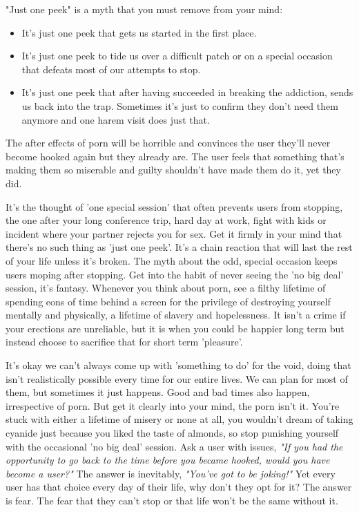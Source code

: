 \documentclass[easypeasy.tex]{subfiles}
\begin{document}
"Just one peek" is a myth that you must remove from your mind:
\begin{itemize}
  \item It's just one peek that gets us started in the first place.
  \item It's just one peek to tide us over a difficult patch or on a special occasion that defeats most of our attempts to stop.
  \item It's just one peek that after having succeeded in breaking the addiction, sends us back into the trap. Sometimes it's just to confirm they don't need them anymore and one harem visit does just that.
\end{itemize}
The after effects of porn will be horrible and convinces the user they'll never become hooked again but they already are. The user feels that something that's making them so miserable and guilty shouldn't have made them do it, yet they did.

It's the thought of 'one special session' that often prevents users from stopping, the one after your long conference trip, hard day at work, fight with kids or incident where your partner rejects you for sex. Get it firmly in your mind that there's no such thing as 'just one peek'. It's a chain reaction that will last the rest of your life unless it's broken. The myth about the odd, special occasion keeps users moping after stopping. Get into the habit of never seeing the 'no big deal' session, it's fantasy. Whenever you think about porn, see a filthy lifetime of spending eons of time behind a screen for the privilege of destroying yourself mentally and physically, a lifetime of slavery and hopelessness. It isn't a crime if your erections are unreliable, but it is when you could be happier long term but instead choose to sacrifice that for short term 'pleasure'.

It's okay we can't always come up with 'something to do' for the void, doing that isn't realistically possible every time for our entire lives. We can plan for most of them, but sometimes it just happens. Good and bad times also happen, irrespective of porn. But get it clearly into your mind, the porn isn't it. You're stuck with either a lifetime of misery or none at all, you wouldn't dream of taking cyanide just because you liked the taste of almonds, so stop punishing yourself with the occasional 'no big deal' session. Ask a user with issues, \textit{"If you had the opportunity to go back to the time before you became hooked, would you have become a user?"} The answer is inevitably, \textit{"You've got to be joking!"} Yet every user has that choice every day of their life, why don't they opt for it? The answer is fear. The fear that they can't stop or that life won't be the same without it.
\end{document}
